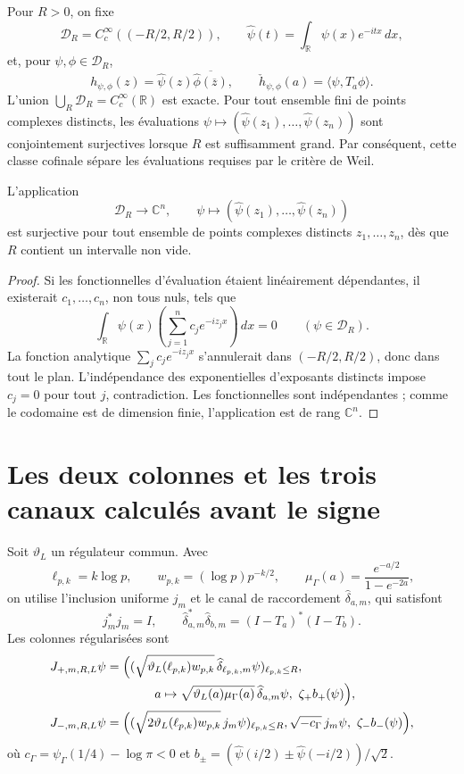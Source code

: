 Pour $R>0$, on fixe
\[
 \mathcal D_R=C_c^\infty((-R/2,R/2)),\qquad
 \widehat\psi(t)=\int_{\mathbb R}\psi(x)e^{-itx}\,dx,
\]
et, pour $\psi,\phi\in\mathcal D_R$,
\[
 h_{\psi,\phi}(z)=\widehat\psi(z)
 \overline{\widehat\phi(\overline z)},\qquad
 \check h_{\psi,\phi}(a)=\langle\psi,T_a\phi\rangle.
\]
L'union $\bigcup_R\mathcal D_R=C_c^\infty(\mathbb R)$ est exacte. Pour tout
ensemble fini de points complexes distincts, les évaluations
$\psi\mapsto(\widehat\psi(z_1),\ldots,\widehat\psi(z_n))$ sont conjointement
surjectives lorsque $R$ est suffisamment grand. Par conséquent, cette classe cofinale
sépare les évaluations requises par le critère de Weil.

\begin{lemma}
\label{lem:pdf2-rh-separacion}
L'application
\[
 \mathcal D_R\longrightarrow\mathbb C^n,
 \qquad
 \psi\longmapsto
 (\widehat\psi(z_1),\ldots,\widehat\psi(z_n))
\]
est surjective pour tout ensemble de points complexes distincts
\(z_1,\ldots,z_n\), dès que \(R\) contient un intervalle non vide.
\end{lemma}

\begin{proof}
Si les fonctionnelles d'évaluation étaient linéairement dépendantes, il existerait
\(c_1,\ldots,c_n\), non tous nuls, tels que
\[
 \int_{\mathbb R}\psi(x)
 \left(\sum_{j=1}^nc_je^{-iz_jx}\right)\,dx=0
 \qquad(\psi\in\mathcal D_R).
\]
La fonction analytique \(\sum_jc_je^{-iz_jx}\) s'annulerait dans
\((-R/2,R/2)\), donc dans tout le plan. L'indépendance des exponentielles
d'exposants distincts impose \(c_j=0\) pour tout \(j\), contradiction.
Les fonctionnelles sont indépendantes ; comme le codomaine est de dimension finie,
l'application est de rang \(\mathbb C^n\).
\end{proof}

\section{Les deux colonnes et les trois canaux calculés avant le signe}

Soit $\vartheta_L$ un régulateur commun. Avec
\[
 \ell_{p,k}=k\log p,\qquad w_{p,k}=(\log p)p^{-k/2},\qquad
 \mu_\Gamma(a)=\frac{e^{-a/2}}{1-e^{-2a}},
\]
on utilise l'inclusion uniforme $j_m$ et le canal de raccordement
$\widehat\delta_{a,m}$, qui satisfont
\[
 j_m^*j_m=I,\qquad
 \widehat\delta_{a,m}^*\widehat\delta_{b,m}
 =(I-T_a)^*(I-T_b).
\]
Les colonnes régularisées sont
\begin{align*}
 J_{+,m,R,L}\psi={}&
 \Bigl(
  (\sqrt{\vartheta_L(\ell_{p,k})w_{p,k}}\,
       \widehat\delta_{\ell_{p,k},m}\psi)_{\ell_{p,k}\leq R},\\
 &\hspace{9mm}a\mapsto
  \sqrt{\vartheta_L(a)\mu_\Gamma(a)}\,
       \widehat\delta_{a,m}\psi,\ \zeta_+b_+(\psi)
 \Bigr),\\
 J_{-,m,R,L}\psi={}&
 \Bigl(
  (\sqrt{2\vartheta_L(\ell_{p,k})w_{p,k}}\,j_m\psi)_{\ell_{p,k}\leq R},
  \sqrt{-c_\Gamma}\,j_m\psi,\ \zeta_-b_-(\psi)
 \Bigr),
\end{align*}
où $c_\Gamma=\psi_\Gamma(1/4)-\log\pi<0$ et
$b_\pm=(\widehat\psi(i/2)\pm\widehat\psi(-i/2))/\sqrt2$.

